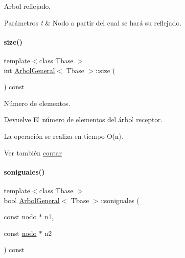 Arbol reflejado. 


\begin{DoxyParams}{Parámetros}
{\em t} & Nodo a partir del cual se hará su reflejado. \\
\hline
\end{DoxyParams}
\hypertarget{classArbolGeneral_ae5f8e2a36299629c36b33e344b0d0c47}{}\label{classArbolGeneral_ae5f8e2a36299629c36b33e344b0d0c47} 
\paragraph{\texorpdfstring{size()}{size()}}
{\footnotesize\ttfamily template$<$class Tbase $>$ \\
int \hyperlink{classArbolGeneral}{Arbol\+General}$<$ Tbase $>$\+::size (\begin{DoxyParamCaption}{ }\end{DoxyParamCaption}) const}



Número de elementos. 

\begin{DoxyReturn}{Devuelve}
El número de elementos del árbol receptor.
\end{DoxyReturn}
La operación se realiza en tiempo O(n). \begin{DoxySeeAlso}{Ver también}
\hyperlink{classArbolGeneral_a9f8c2adf966a9fe3155921bb849d3999}{contar} 
\end{DoxySeeAlso}
\hypertarget{classArbolGeneral_a645db91bf075b5a01e0cd5a072cedf1e}{}\label{classArbolGeneral_a645db91bf075b5a01e0cd5a072cedf1e} 
\paragraph{\texorpdfstring{soniguales()}{soniguales()}}
{\footnotesize\ttfamily template$<$class Tbase $>$ \\
bool \hyperlink{classArbolGeneral}{Arbol\+General}$<$ Tbase $>$\+::soniguales (\begin{DoxyParamCaption}\item[{const \hyperlink{structArbolGeneral_1_1nodo}{nodo} $\ast$}]{n1,  }\item[{const \hyperlink{structArbolGeneral_1_1nodo}{nodo} $\ast$}]{n2 }\end{DoxyParamCaption}) const\hspace{0.3cm}{\ttfamily [private]}}



